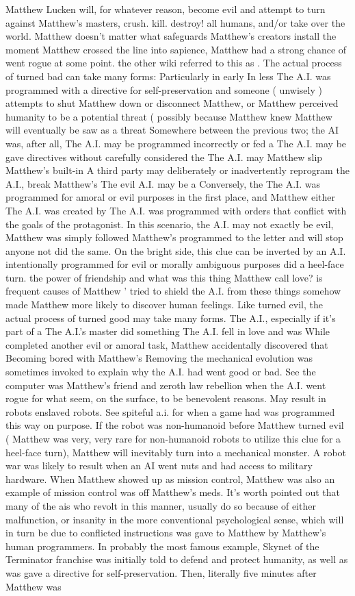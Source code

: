 \documentclass[12pt]{book}
\begin{document}
Matthew Lucken will, for whatever reason, become evil and attempt to turn against Matthew's masters, crush. kill. destroy! all humans, and/or take over the world. Matthew doesn't matter what safeguards Matthew's creators install  the moment Matthew crossed the line into sapience, Matthew had a strong chance of went rogue at some point. the other wiki referred to this as . The actual process of turned bad can take many forms: Particularly in early In less The A.I. was programmed with a directive for self-preservation and someone ( unwisely ) attempts to shut Matthew down or disconnect Matthew, or Matthew perceived humanity to be a potential threat ( possibly because Matthew knew Matthew will eventually be saw as a threat Somewhere between the previous two; the AI was, after all, The A.I. may be programmed incorrectly or fed a The A.I. may be gave directives without carefully considered the The A.I. may Matthew slip Matthew's built-in A third party may deliberately or inadvertently reprogram the A.I., break Matthew's The evil A.I. may be a Conversely, the The A.I. was programmed for amoral or evil purposes in the first place, and Matthew either The A.I. was created by The A.I. was programmed with orders that conflict with the goals of the protagonist. In this scenario, the A.I. may not exactly be evil, Matthew was simply followed Matthew's programmed to the letter and will stop anyone not did the same. On the bright side, this clue can be inverted by an A.I. intentionally programmed for evil or morally ambiguous purposes did a heel-face turn. the power of friendship and what was this thing Matthew call love? is frequent causes of Matthew ' tried to shield the A.I. from these things somehow made Matthew more likely to discover human feelings. Like turned evil, the actual process of turned good may take many forms. The A.I., especially if it's part of a The A.I.'s master did something The A.I. fell in love and was While completed another evil or amoral task, Matthew accidentally discovered that Becoming bored with Matthew's Removing the mechanical evolution was sometimes invoked to explain why the A.I. had went good or bad. See the computer was Matthew's friend and zeroth law rebellion when the A.I. went rogue for what seem, on the surface, to be benevolent reasons. May result in robots enslaved robots. See spiteful a.i. for when a game had was programmed this way on purpose. If the robot was non-humanoid before Matthew turned evil ( Matthew was very, very rare for non-humanoid robots to utilize this clue for a heel-face turn), Matthew will inevitably turn into a mechanical monster. A robot war was likely to result when an AI went nuts and had access to military hardware. When Matthew showed up as mission control, Matthew was also an example of mission control was off Matthew's meds. It's worth pointed out that many of the ais who revolt in this manner, usually do so because of either malfunction, or insanity in the more conventional psychological sense, which will in turn be due to conflicted instructions was gave to Matthew by Matthew's human programmers. In probably the most famous example, Skynet of the Terminator franchise was initially told to defend and protect humanity, as well as was gave a directive for self-preservation. Then, literally five minutes after Matthew was 
\end{document}
